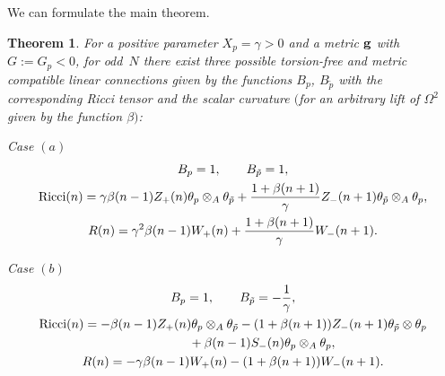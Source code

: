 \documentclass[10pt,a4paper]{amsart}
\numberwithin{equation}{section}
\newtheorem{Theorem}{Theorem}[section]
\newcommand{\ip}{{\tilde{p}}}
\begin{document}
We can formulate the main theorem.
\begin{Theorem}
\label{positive_curvature}
For a positive parameter $X_p=\gamma>0$ and a metric ${\bf g}$ with $G:=G_p < 0$, for odd~$N$ there exist three possible torsion-free and metric compatible linear connections given by the functions $B_p$, $B_\ip$ with the corresponding Ricci tensor and the scalar curvature $($for an arbitrary lift of $\Omega^2$ given by the function $\beta)$:

Case $(a)$
\begin{gather*}
 B_p=1,\qquad B_\ip=1, \\
{\rm Ricci}(n) = \gamma \beta(n-1) Z_+(n) \theta_p \otimes_A \theta_\ip + \frac{1+\beta(n+1)}{\gamma} Z_-(n+1) \theta_\ip \otimes_A \theta_p, \\
 R(n) = \gamma^2 \beta(n-1) W_+(n) +\frac{1+\beta(n+1)}{\gamma} W_-(n+1).
\end{gather*}

Case $(b)$
\begin{gather*}
B_p=1, \qquad B_\ip=-\frac{1}{\gamma}, \\
{\rm Ricci}(n) = -\beta(n-1)Z_+(n)\theta_p\otimes_A\theta_\ip-(1+\beta(n+1))Z_-(n+1)\theta_\ip\otimes\theta_p\\
\hphantom{{\rm Ricci}(n) =}{} +\beta(n-1)S_-(n)\theta_p\otimes_A\theta_p,\\
 R(n) = -\gamma\beta(n-1)W_+(n)-(1+\beta(n+1))W_-(n+1).
\end{gather*}


\end{Theorem}
\end{document}
